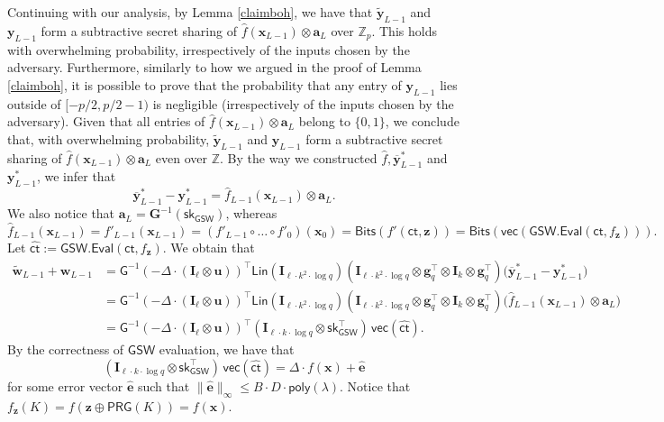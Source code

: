 \documentclass{theoretics}
\newcommand{\Z}{\mathbb{Z}}
\newcommand{\poly}{\mathsf{poly}}
\renewcommand{\sec}{\ensuremath{\lambda}}
\newcommand{\ct}{\mathsf{ct}}
\newcommand{\BV}{\mathsf{GSW}}
\newcommand{\algofont}[1]{\ensuremath{\mathsf{#1}}}
\newcommand{\Eval}{\algofont{Eval}\xspace}
\newcommand{\id}{\ensuremath{\mathbf{I}}}
\newcommand{\sk}{{\mathsf{sk}}}
\begin{document}
Continuing with our analysis, by Lemma \ref{claimboh}, we have that $\tilde{\mathbf{y}}_{L-1}$ and $\mathbf{y}_{L-1}$ form a subtractive secret sharing of $\hat{f}(\mathbf{x}_{L-1})\otimes \mathbf{a}_{L}$ over $\Z_p$. {This holds with overwhelming probability, irrespectively of the inputs chosen by the adversary.} Furthermore, similarly to how we argued in the proof of Lemma \ref{claimboh}, it is possible to prove that the probability that any entry of $\mathbf{y}_{L-1}$ lies outside of $[-p/2, p/2-1)$ is negligible {(irrespectively of the inputs chosen by the adversary)}. Given that all entries of $\hat{f}(\mathbf{x}_{L-1})\otimes \mathbf{a}_{L}$ belong to $\{0, 1\}$, we conclude that, with overwhelming probability, $\tilde{\mathbf{y}}_{L-1}$ and $\mathbf{y}_{L-1}$ form a subtractive secret sharing of $\hat{f}(\mathbf{x}_{L-1})\otimes \mathbf{a}_{L}$ even over $\Z$. By the way we constructed $\hat{f}, \overline{\mathbf{y}}^\ast_{L-1}$ and $\mathbf{y}^\ast_{L-1}$, we infer that \[
\overline{\mathbf{y}}_{L-1}^\ast-\mathbf{y}^\ast_{L-1}
=\hat{f}_{L-1}(\mathbf{x}_{L-1})\otimes \mathbf{a}_{L}.
\]
We also notice that $\mathbf{a}_L=\mathbf{G}^{-1}(\sk_\BV)$, whereas
\[\hat{f}_{L-1}(\mathbf{x}_{L-1})=f'_{L-1}(\mathbf{x}_{L-1})=(f'_{L-1}\circ\dots \circ f'_0)(\mathbf{x}_0)=\mathsf{Bits}(f'(\ct, \mathbf{z}))=\mathsf{Bits}(\mathsf{vec}(\BV.\Eval(\ct, f_{\mathbf{z}}))).\]
Let $\hat{\ct}:=\BV.\Eval(\ct, f_{\mathbf{z}})$. We obtain that
\begin{align*}
\tilde{\mathbf{w}}_{L-1}+\mathbf{w}_{L-1}
&=\mathsf{G}^{-1}(-\Delta\cdot (\id_\ell\otimes \mathbf u))^\intercal
\mathsf{Lin}(\id_{\ell\cdot k^2\cdot \log q})
(\id_{\ell\cdot k^2\cdot \log q}\otimes \mathbf g_q^\intercal\otimes \id_k\otimes \mathbf g_q^\intercal)
\bigl(\overline{\mathbf y}^\ast_{L-1}-\mathbf{y}^\ast_{L-1}\bigr)\\
&=\mathsf{G}^{-1}(-\Delta\cdot (\id_\ell\otimes \mathbf u))^\intercal
\mathsf{Lin}(\id_{\ell\cdot k^2\cdot \log q})
(\id_{\ell\cdot k^2\cdot \log q}\otimes \mathbf g_q^\intercal\otimes \id_k\otimes \mathbf g_q^\intercal)
\bigl(\hat f_{L-1}(\mathbf x_{L-1})\otimes \mathbf a_L\bigr)\\
&=\mathsf{G}^{-1}(-\Delta\cdot (\id_\ell\otimes \mathbf u))^\intercal
(\id_{\ell\cdot k\cdot \log q}\otimes \sk_\BV^\intercal)\,\mathsf{vec}(\hat{\ct}).
\end{align*}
By the correctness of $\BV$ evaluation, we have that
\[
(\id_{\ell\cdot k\cdot \log q}\otimes \sk_\BV^\intercal)\,\mathsf{vec}(\hat{\ct})
=\Delta\cdot f(\mathbf{x})+\widehat{\mathbf e}
\]
for some error vector $\widehat{\mathbf e}$ such that $\lVert\widehat{\mathbf e}\rVert_\infty\le B\cdot D\cdot \poly(\sec)$. Notice that $f_{\mathbf{z}}(K)=f(\mathbf{z}\oplus \mathsf{PRG}(K))=f(\mathbf{x})$.
\end{document}
